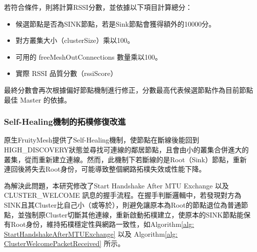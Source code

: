\begin{ZhChapter}
若符合條件，則將計算RSSI分數，並依據以下項目計算總分：

\begin{itemize}
    \item 候選節點是否為SINK節點，若是Sink節點會獲得額外的10000分。
    \item 對方叢集大小（clusterSize）乘以100。
    \item 可用的 freeMeshOutConnections 數量乘以100。
    \item 實際 RSSI 品質分數（rssiScore）
\end{itemize}

最終分數會再次根據偏好節點機制進行修正，分數最高代表候選節點作為目前節點最佳 Master 的依據。

\newpage
\subsubsection{Self-Healing機制的拓樸修復改進}

原生FruityMesh提供了Self-Healing機制，使節點在斷線後能回到HIGH\_DISCOVERY狀態並尋找可連線的鄰居節點，且會由小的叢集合併進大的叢集，從而重新建立連線。然而，此機制下若斷線的是Root（Sink）節點，重新連回後將失去Root身份，可能導致整個網路拓樸失效或性能下降。

為解決此問題，本研究修改了Start Handshake After MTU Exchange 以及 CLUSTER\_WELCOME 訊息的握手流程。在握手判斷邏輯中，若發現對方為SINK且其Cluster比自己小（或等於），則避免讓原本為Root的節點退位為普通節點，並強制原Cluster切斷其他連線，重新啟動拓樸建立，使原本的SINK節點能保有Root身份，維持拓樸穩定性與網路一致性，如Algorithm\ref{alg: StartHandshakeAfterMTUExchange} 以及 Algorithm\ref{alg: ClusterWelcomePacketReceived} 所示。


\end{ZhChapter}
